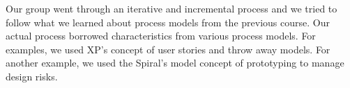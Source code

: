 Our group went through an iterative and incremental process
and we tried to follow what we learned about process models
from the previous course.
Our actual process borrowed characteristics from various process models.
For examples,
we used XP's concept of user stories and throw away models.
For another example,
we used the Spiral's model concept of prototyping
to manage design risks.
